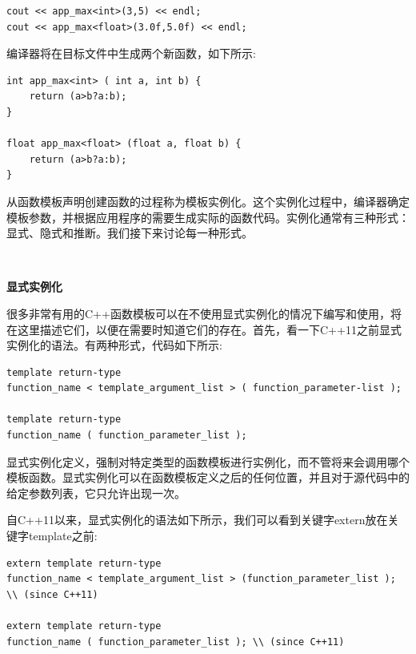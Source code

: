 \begin{lstlisting}[caption={}]
cout << app_max<int>(3,5) << endl;
cout << app_max<float>(3.0f,5.0f) << endl;
\end{lstlisting}

编译器将在目标文件中生成两个新函数，如下所示:\par

\begin{lstlisting}[caption={}]
int app_max<int> ( int a, int b) {
	return (a>b?a:b);
}

float app_max<float> (float a, float b) {
	return (a>b?a:b);
}
\end{lstlisting}

从函数模板声明创建函数的过程称为模板实例化。这个实例化过程中，编译器确定模板参数，并根据应用程序的需要生成实际的函数代码。实例化通常有三种形式：显式、隐式和推断。我们接下来讨论每一种形式。 \par

\noindent\textbf{}\ \par
\textbf{显式实例化} \ \par
很多非常有用的C++函数模板可以在不使用显式实例化的情况下编写和使用，将在这里描述它们，以便在需要时知道它们的存在。首先，看一下C++11之前显式实例化的语法。有两种形式，代码如下所示: \par

\begin{lstlisting}[caption={}]
template return-type
function_name < template_argument_list > ( function_parameter-list );

template return-type
function_name ( function_parameter_list );
\end{lstlisting}

显式实例化定义，强制对特定类型的函数模板进行实例化，而不管将来会调用哪个模板函数。显式实例化可以在函数模板定义之后的任何位置，并且对于源代码中的给定参数列表，它只允许出现一次。 \par
自C++11以来，显式实例化的语法如下所示，我们可以看到关键字extern放在关键字template之前: \par

\begin{lstlisting}[caption={}]
extern template return-type
function_name < template_argument_list > (function_parameter_list ); \\ (since C++11)

extern template return-type
function_name ( function_parameter_list ); \\ (since C++11)
\end{lstlisting}

